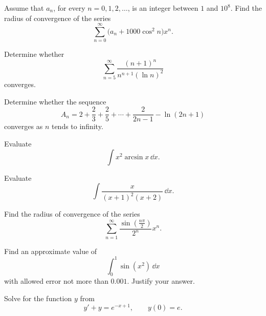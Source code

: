 \begin{problem}
Assume that $a_n$, for every $n=0,1,2,\ldots$, is an integer between $1$ and $10^8$. Find the radius of convergence of the series
\[
\sum_{n=0}^{\infty}\bigl(a_n+1000\cos^2 n\bigr)x^n.
\]
\end{problem}

\begin{problem}
Determine whether
\[
\sum_{n=5}^{\infty}
\frac{(n+1)^n}{n^{n+1}(\ln n)^2}
\]
converges.
\end{problem}

\begin{problem}
Determine whether the sequence
\[
A_n
=2+\frac{2}{3}+\frac{2}{5}+\cdots+\frac{2}{2n-1}-\ln(2n+1)
\]
converges as $n$ tends to infinity.
\end{problem}

\begin{problem}
Evaluate
\[
\int x^2\arcsin x\,\dd x.
\]
\end{problem}

\begin{problem}
Evaluate
\[
\int \frac{x}{(x+1)^2(x+2)}\,\dd x.
\]
\end{problem}

\begin{problem}
Find the radius of convergence of the series
\[
\sum_{n=1}^{\infty}
\frac{\sin\!\left(\frac{n\pi}{2}\right)}{2^n}x^n.
\]
\end{problem}

\begin{problem}
Find an approximate value of
\[
\int_0^1\sin(x^2)\,\dd x
\]
with allowed error not more than $0.001$. Justify your answer.
\end{problem}

\begin{problem}
Solve for the function $y$ from
\[
y'+y=e^{-x+1},
\qquad
y(0)=e.
\]
\end{problem}

